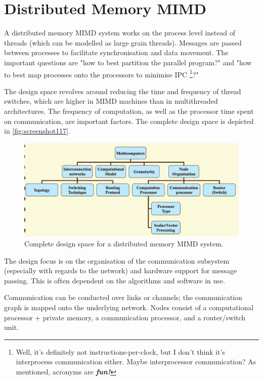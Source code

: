 \chapter{Distributed Memory MIMD}
A distributed memory MIMD system works on the process level instead of threads (which can be modelled as large grain threads). Messages are passed between processes to facilitate synchronisation and data movement. The important questions are "how to best partition the parallel program?" and "how to best map processes onto the processors to minimise IPC \footnote{Well, it's definitely not instructions-per-clock, but I don't think it's interprocess communication either. Maybe interprocessor communication? As mentioned, acronyms are \textbf{\textit{fun!}}}?"

The design space revolves around reducing the time and frequency of thread switches, which are higher in MIMD machines than in multithreaded architectures. The frequency of computation, as well as the processor time spent on communication, are important factors. The complete design space is depicted in \autoref{fig:screenshot117}.

\begin{figure}
\centering
\includegraphics[width=0.7\linewidth]{screenshot117}
\caption{Complete design space for a distributed memory MIMD system.}
\label{fig:screenshot117}
\end{figure}

The design focus is on the organisation of the communication subsystem (especially with regards to the network) and hardware support for message passing. This is often dependent on the algorithms and software in use.

Communication can be conducted over links or channels; the communication graph is mapped onto the underlying network. Nodes consist of a computational processor + private memory, a communication processor, and a router/switch unit.

